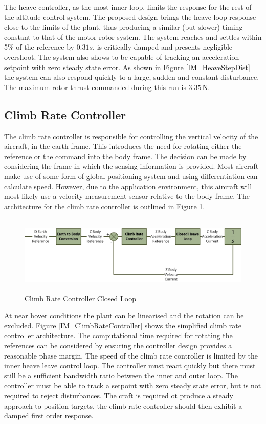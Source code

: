 \documentclass[12pt]{report}
\begin{document}
The heave controller, as the most inner loop, limits the response for the rest of the altitude control system. The proposed design brings the heave loop response close to the limits of the plant, thus producing a similar (but slower) timing constant to that of the motor-rotor system. The system reaches and settles within 5\% of the reference by $0.31s$, is critically damped and presents negligible overshoot. The system also shows to be capable of tracking an acceleration setpoint with zero steady state error. As shown in Figure \ref{IM_HeaveStepDist} the system can also respond quickly to a large, sudden and constant disturbance. The maximum rotor thrust commanded during this run is $3.35$\,N. 

\subsection{Climb Rate Controller}
The climb rate controller is responsible for controlling the vertical velocity of the aircraft, in the earth frame. This introduces the need for rotating either the reference or the command into the body frame. The decision can be made by considering the frame in which the sensing information is provided. Most aircraft make use of some form of global positioning system and using differentiation can calculate speed. However, due to the application environment, this aircraft will most likely use a velocity measurement sensor relative to the body frame. The architecture for the climb rate controller is outlined in Figure \ref{IM_ClimbRateControlLoop}. 

\begin{figure}[H]
	\centering
	\includegraphics[height = 3.75cm]{../References/Diagrams/ClimbRateLoop.jpg}
	\caption{Climb Rate Controller Closed Loop}
	\label{IM_ClimbRateControlLoop}
\end{figure}

At near hover conditions the plant can be linearised and the rotation can be excluded. Figure \ref{IM_ClimbRateController} shows the simplified climb rate controller architecture. The computational time required for rotating the references can be considered by ensuring the controller design provides a reasonable phase margin. The speed of the climb rate controller is limited by the inner heave leave control loop. The controller must react quickly but there must still be a sufficient bandwidth ratio between the inner and outer loop. The controller must be able to track a setpoint with zero steady state error, but is not required to reject disturbances. The craft is required ot produce a steady approach to position targets, the climb rate controller should then exhibit a damped first order response.
\end{document}
